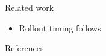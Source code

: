 \documentclass[11pt,aspectratio=169]{beamer}
\begin{document}
\begin{frame}{Related work}
  \begin{itemize}
    \item Rollout timing follows \cite{fixtureRollout2021}
  \end{itemize}
\end{frame}

\begin{frame}{References}
  \printbibliography
\end{frame}
\end{document}
